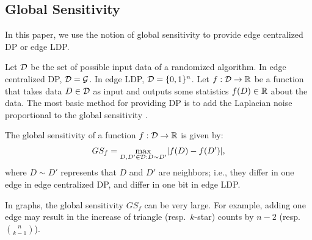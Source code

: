 \subsection{Global Sensitivity}
\label{chap1-sub:sensitivity}
In this paper, we use the notion of global sensitivity \cite{DP} to provide edge centralized DP or edge LDP.

Let $\mathcal{D}$ be the set of possible input data of a randomized algorithm. 
In edge centralized DP, $\mathcal{D} = \mathcal{G}$. 
In edge LDP, $\mathcal{D} = \{0,1\}^n$. 
Let $f: \mathcal{D} \rightarrow \mathbb{R}$ be a function that takes data $D \in \mathcal{D}$ as input and outputs some statistics $f(D) \in \mathbb{R}$ about the data. 
The most basic method for providing DP is to add the Laplacian noise proportional to the global sensitivity \cite{DP}.

\begin{definition}  \label{chap1-def:global_sen} 
The global sensitivity of a function $f: \mathcal{D} \rightarrow \mathbb{R}$ is given by:
\begin{align*}
GS_f = \underset{D,D' \in \mathcal{D}: D \sim D'}{\max} |f(D) - f(D')|,
\end{align*}
where $D \sim D'$ represents that $D$ and $D'$ are neighbors; i.e., they differ in one edge in edge centralized DP, and differ in one bit in edge LDP.
\end{definition}



In graphs, the global sensitivity $GS_f$ can be very large. 
For example, adding one edge may result in the increase of triangle (resp.~$k$-star) counts by $n-2$ (resp.~$\binom{n}{k-1}$). 

